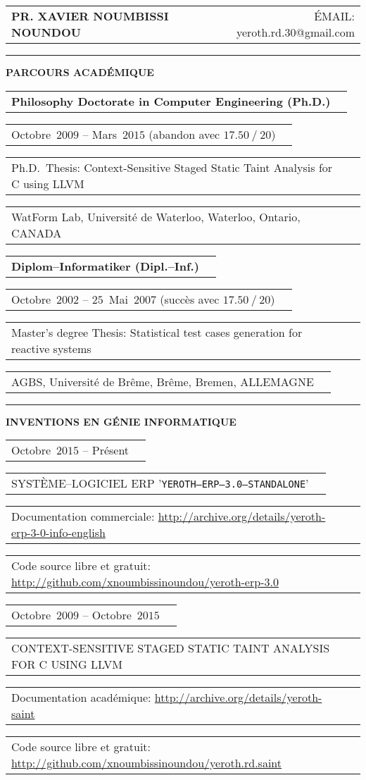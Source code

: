 \documentclass[9pt,a4paper]{article} %
\makeatletter
\newcommand{\headerrow}[2]
{\begin{tabular*}{\linewidth}{l@{\extracolsep{\fill}}r}
	#1 &
	#2 \\
\end{tabular*}}
\newcommand{\cvitemdate}[2]{#1~$#2$\xspace}
\makeatother
\begin{document}
\bigskip


\headerrow
	{\Large \textbf{PR. XAVIER NOUMBISSI NOUNDOU}}	
	{\large ÉMAIL: yeroth.rd.30@gmail.com}

\vspace{1em}


\hrule
\begin{center}
{\large \textbf{PARCOURS ACADÉMIQUE}}
\end{center}

\vspace{0.5em}

\headerrow
	{\textbf{Philosophy Doctorate in Computer Engineering (Ph.D.)}}	
	{}
\headerrow
	{\cvitemdate{Octobre}{2009} -- \cvitemdate{Mars}{2015} (abandon avec $17.50~/~20$)}	
	{}
\headerrow
	{Ph.D.~Thesis: Context-Sensitive Staged Static Taint Analysis for C using LLVM}
	{}
\headerrow
	{WatForm Lab, Université de Waterloo, Waterloo, Ontario, CANADA}
	{}
	
\vspace{0.3em}
	
\headerrow
	{\textbf{Diplom--Informatiker (Dipl.--Inf.)}}	
	{}
\headerrow
	{\cvitemdate{Octobre}{2002} -- \cvitemdate{$25$~Mai}{2007} (succès avec $17.50~/~20$)}	
	{}
\headerrow
	{Master's degree Thesis: Statistical test cases generation for reactive systems}
	{}
\headerrow
	{AGBS, Université de Brême, Brême, Bremen, ALLEMAGNE}
	{}

\vspace{1em}

\hrule
\begin{center}
{\large \textbf{INVENTIONS EN GÉNIE INFORMATIQUE}}
\end{center}

\vspace{0.5em}

\headerrow
	{\cvitemdate{Octobre}{2015} -- Présent}	
	{}
\headerrow
	{SYSTÈME--LOGICIEL ERP '\texttt{YEROTH--ERP--3.0--STANDALONE}'}
	{}
\headerrow
	{Documentation commerciale: \url{http://archive.org/details/yeroth-erp-3-0-info-english}}
	{}
\headerrow
	{Code source libre et gratuit: \url{http://github.com/xnoumbissinoundou/yeroth-erp-3.0}}
	{}

\vspace{0.3em}
	
\headerrow
	{\cvitemdate{Octobre}{2009} -- \cvitemdate{Octobre}{2015}}	
	{}
\headerrow
	{CONTEXT-SENSITIVE STAGED STATIC TAINT ANALYSIS FOR C USING LLVM}
	{}
\headerrow
	{Documentation académique: \url{http://archive.org/details/yeroth-saint}}
	{}
\headerrow
	{Code source libre et gratuit: \url{http://github.com/xnoumbissinoundou/yeroth.rd.saint}}
	{}
	
\end{document}
